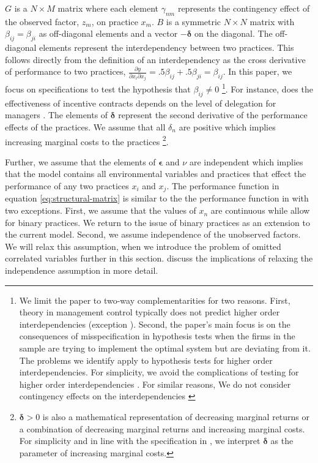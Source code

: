 \documentclass[12pt]{article}
\begin{document}
$G$ is a $N \times M$ matrix where each element $\gamma_{nm}$ represents the contingency effect of the observed factor, $z_m$, on practice $x_m$. $B$ is a symmetric $N \times N$ matrix with $\beta_{ij} = \beta_{ji}$ as off-diagonal elements and a vector $-\mathbf{\delta}$ on the diagonal. The off-diagonal elements represent the interdependency between two practices. This follows directly from the definition of an interdependency as the cross derivative of performance to two practices, $\frac{\partial y}{\partial x_i \partial x_j} = .5 \beta_{ij} + .5 \beta_{ji} = \beta_{ij}$. In this paper, we focus on specifications to test the hypothesis that $\beta_{ij} \neq 0$ \footnote{We limit the paper to two-way complementarities for two reasons. First, theory in management control typically does not predict higher order interdependencies (exception \citet{Aral2012}). Second, the paper's main focus is on the consequences of misspecification in hypothesis tests when the firms in the sample are trying to implement the optimal system but are deviating from it. The problems we identify apply to hypothesis tests for higher order interdependencies. For simplicity, we avoid the complications of testing for higher order interdependencies \citep{Carree2011}. For similar reasons, We do not consider contingency effects on the interdependencies \citep{Grabner2016,Matejka2017BalancingEvidence}}. For instance, does the effectiveness of incentive contracts depends on the level of delegation for managers \citep{Moers2006}.  The elements of $\mathbf{\delta}$ represent the second derivative of the performance effects of the practices. We assume that all $\delta_n$ are positive which implies increasing marginal costs to the practices  \footnote{$\mathbf{\delta} > 0$ is also a mathematical representation of decreasing marginal returns or a combination of decreasing marginal returns and increasing marginal  costs. For simplicity and in line with the specification in \citet{Grabner2013}, we interpret $\mathbf{\delta}$ as the parameter of  increasing marginal costs.}. 

Further, we assume that the elements of $\mathbf{\epsilon}$ and $\nu$ are independent which implies that the model contains all environmental variables and practices that effect the performance of any two practices $x_i$ and $x_j$. The performance function in equation \eqref{eq:structural-matrix} is similar to the the performance function in \citet{Kretschmer2012} with two exceptions. First, we assume that the values of $x_n$ are continuous while \citet{Kretschmer2012} allow for binary practices. We return to the issue of binary practices as an extension to the current model. Second, we assume independence of the unobserved factors. We will relax this assumption, when we introduce the problem of omitted correlated variables further in this section. \citet{Athey1998} discuss the implications of relaxing the independence assumption in more detail. 
\end{document}
